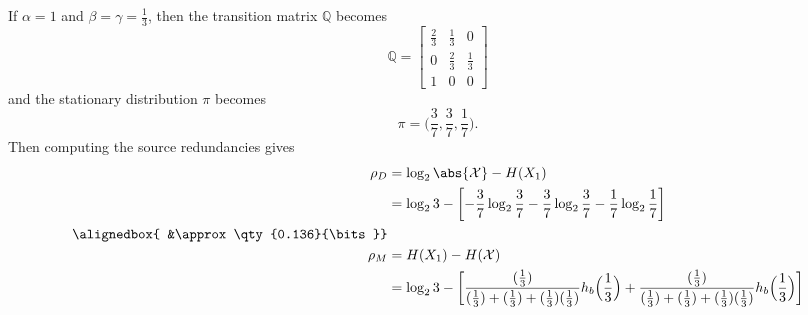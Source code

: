 \documentclass[
  coursecode={MTHE 474},
  assignmentname={Homework \homeworknumber},
  studentnumber=20053722,
  name={Bryan Hoang},
  draft,
]{
  ltxanswer%
}
\begin{document}
\begin{questions}
\begin{parts}
\begin{subparts}
        \subpart{}
        \begin{solution}
          If \(\alpha=1\) and \(\beta=\gamma=\frac{1}{3}\), then the transition matrix \(\mathbb{Q}\) becomes
          \begin{equation*}
            \mathbb{Q} = \begin{bmatrix}
              \frac{2}{3} & \frac{1}{3} & 0           \\
              0           & \frac{2}{3} & \frac{1}{3} \\
              1           & 0           & 0
            \end{bmatrix}
          \end{equation*}
          and the stationary distribution \(\pi\) becomes
          \begin{equation*}
            \pi = \bigl(\frac{3}{7},\frac{3}{7},\frac{1}{7}\bigr).
          \end{equation*}
          Then computing the source redundancies gives
          \begin{align*}
            \rho_{D}     &= \log_{2}\abs{\mathcal{X}} - H(X_{1})                                                                                                                                                                                                          \\
                         &= \log_{2}3 - \biggl[- \frac{3}{7}\log_{2}\frac{3}{7} - \frac{3}{7}\log_{2}\frac{3}{7} - \frac{1}{7}\log_{2}\frac{1}{7}\biggr]                                                                                                                  \\
            \alignedbox{ &\approx \qty{0.136}{\bits}}                                                                                                                                                                                                                     \\
            \rho_{M}     &= H(X_{1}) - H(\mathcal{X})                                                                                                                                                                                                                     \\
                         &= \log_{2}3 - \biggl[\frac{(\frac{1}{3})}{(\frac{1}{3})+(\frac{1}{3})+(\frac{1}{3})(\frac{1}{3})}h_{b}\Bigl(\frac{1}{3}\Bigr) + \frac{(\frac{1}{3})}{(\frac{1}{3})+(\frac{1}{3})+(\frac{1}{3})(\frac{1}{3})}h_{b}\Bigl(\frac{1}{3}\Bigr)\biggr] \\

\end{align*}
\end{solution}
\end{subparts}
\end{parts}
\end{questions}
\end{document}
